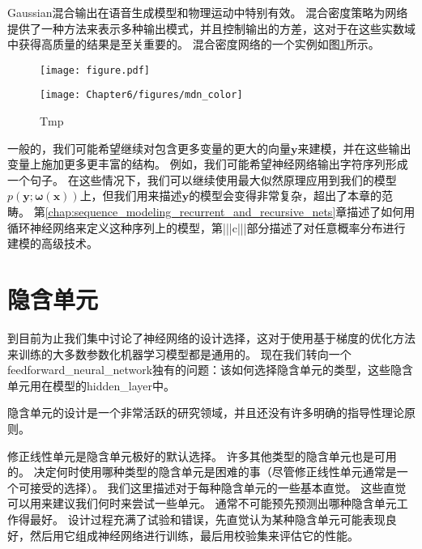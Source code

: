 
Gaussian混合输出在语音生成模型\citep{schuster1999supervised}和物理运动\citep{Graves-arxiv2013}中特别有效。
混合密度策略为网络提供了一种方法来表示多种输出模式，并且控制输出的方差，这对于在这些实数域中获得高质量的结果是至关重要的。
混合密度网络的一个实例如图\ref{fig:chap6_mdn_color}所示。
\begin{figure}[!htb]
\ifOpenSource
\centerline{\texttt{[image: figure.pdf]}}
\else
\centerline{\texttt{[image: Chapter6/figures/mdn\_color]}}
\fi
\caption{Tmp}
\label{fig:chap6_mdn_color}
\end{figure}


一般的，我们可能希望继续对包含更多变量的更大的向量$\bm{y}$来建模，并在这些输出变量上施加更多更丰富的结构。
例如，我们可能希望神经网络输出字符序列形成一个句子。
在这些情况下，我们可以继续使用最大似然原理应用到我们的模型$p(\bm{y};\bm{\omega}(\bm{x}))$上，但我们用来描述$\bm{y}$的模型会变得非常复杂，超出了本章的范畴。
第\ref{chap:sequence_modeling_recurrent_and_recursive_nets}章描述了如何用循环神经网络来定义这种序列上的模型，第|||c|||部分描述了对任意概率分布进行建模的高级技术。

\section{隐含单元}
\label{sec:hidden_units}

到目前为止我们集中讨论了神经网络的设计选择，这对于使用基于梯度的优化方法来训练的大多数参数化机器学习模型都是通用的。
现在我们转向一个\gls{feedforward_neural_network}独有的问题：该如何选择隐含单元的类型，这些隐含单元用在模型的\gls{hidden_layer}中。


隐含单元的设计是一个非常活跃的研究领域，并且还没有许多明确的指导性理论原则。

修正线性单元是隐含单元极好的默认选择。
许多其他类型的隐含单元也是可用的。
决定何时使用哪种类型的隐含单元是困难的事（尽管修正线性单元通常是一个可接受的选择）。
我们这里描述对于每种隐含单元的一些基本直觉。
这些直觉可以用来建议我们何时来尝试一些单元。
通常不可能预先预测出哪种隐含单元工作得最好。
设计过程充满了试验和错误，先直觉认为某种隐含单元可能表现良好，然后用它组成神经网络进行训练，最后用校验集来评估它的性能。

